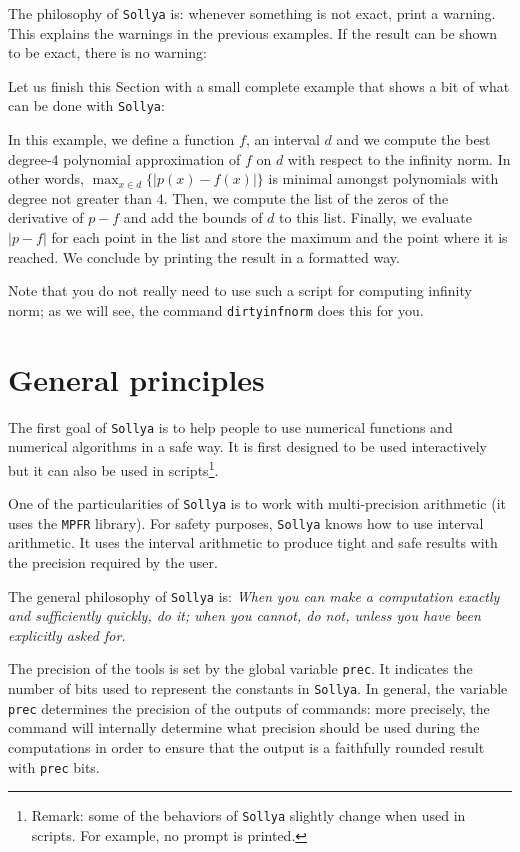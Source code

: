 \documentclass[a4paper]{article}
\newcommand{\com}[1]{\texttt{#1}}
\newcommand{\key}[1]{\texttt{#1}}
\newcommand{\sollya}{\texttt{Sollya}\xspace}
\begin{document}


The philosophy of \sollya is: whenever something is not exact, print a warning. This explains the warnings in the previous examples. If the result can be shown to be exact, there is no warning:



Let us finish this Section with a small complete example that shows a bit of what can be done with \sollya:



In this example, we define a function $f$, an interval $d$ and we compute the best degree-4 polynomial approximation of $f$ on $d$ with respect to the infinity norm. In other words, $\max_{x \in d} \{|p(x)-f(x)|\}$ is minimal amongst polynomials with degree not greater than $4$. Then, we compute the list of the zeros of the derivative of $p-f$ and add the bounds of $d$ to this list. Finally, we evaluate $|p-f|$ for each point in the list and store the maximum and the point where it is reached. We conclude by printing the result in a formatted way.

Note that you do not really need to use such a script for computing infinity norm; as we will see, the command \com{dirtyinfnorm} does this for you.

\section{General principles}
The first goal of \sollya is to help people to use numerical functions and numerical algorithms in a safe way. It is first designed to be used interactively but it can also be used in scripts\footnote{Remark: some of the behaviors of \sollya slightly change when used in scripts. For example, no prompt is printed.}.

One of the particularities of \sollya is to work with multi-precision arithmetic (it uses the \texttt{MPFR} library). For safety purposes, \sollya knows how to use interval arithmetic. It uses the interval arithmetic to produce tight and safe results with the precision required by the user.

The general philosophy of \sollya is: \emph{When you can make a computation exactly and sufficiently quickly, do it; when you cannot, do not, unless you have been explicitly asked for.}

The precision of the tools is set by the global variable \key{prec}. It indicates the number of bits used to represent the constants in \sollya. In general, the variable \key{prec} determines the precision of the outputs of commands: more precisely, the command will internally determine what precision should be used during the computations in order to ensure that the output is a faithfully rounded result with \key{prec} bits.
\end{document}
